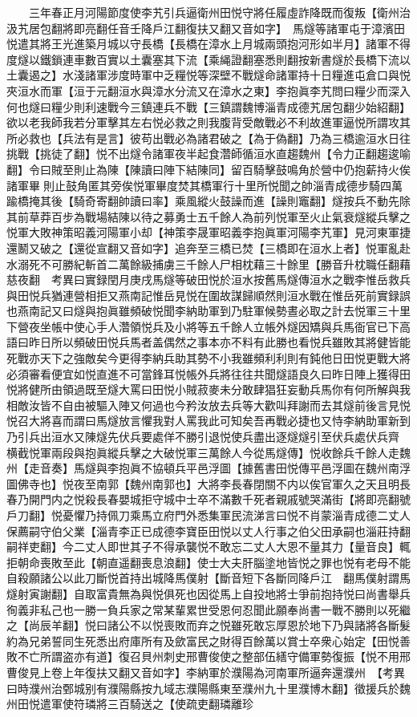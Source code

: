 　　三年春正月河陽節度使李艽引兵逼衛州田悦守將任履虛詐降既而復叛【衛州治汲艽居包翻將即亮翻任音壬降戶江翻復扶又翻又音如字】　馬燧等諸軍屯于漳濱田悦遣其將王光進築月城以守長橋【長橋在漳水上月城兩頭抱河形如半月】諸軍不得度燧以鐵鎖連車數百實以土囊塞其下流【乘䋲證翻塞悉則翻按新書燧於長橋下流以土囊遏之】水淺諸軍涉度時軍中乏糧悦等深壁不戰燧命諸軍持十日糧進屯倉口與悦夾洹水而軍【洹于元翻洹水與漳水分流又在漳水之東】李抱眞李艽問曰糧少而深入何也燧曰糧少則利速戰今三鎮連兵不戰【三鎮謂魏博淄青成德艽居包翻少始紹翻】欲以老我師我若分軍擊其左右悦必救之則我腹背受敵戰必不利故進軍逼悦所謂攻其所必救也【兵法有是言】彼苟出戰必為諸君破之【為于偽翻】乃為三橋逾洹水日往挑戰【挑徒了翻】悦不出燧令諸軍夜半起食濳師循洹水直趨魏州【令力正翻趨逡喻翻】令曰賊至則止為陳【陳讀曰陣下結陳同】留百騎擊鼓鳴角於營中仍抱薪持火俟諸軍畢則止鼓角匿其旁俟悦軍畢度焚其橋軍行十里所悦聞之帥淄青成德步騎四萬踰橋掩其後【騎奇寄翻帥讀曰率】乘風縱火鼓譟而進【譟則竈翻】燧按兵不動先除其前草莽百步為戰場結陳以待之募勇士五千餘人為前列悦軍至火止氣衰燧縱兵擊之悦軍大敗神策昭義河陽軍小却【神策李晟軍昭義李抱眞軍河陽李艽軍】見河東軍捷還鬭又破之【還從宣翻又音如字】追奔至三橋已焚【三橋即在洹水上者】悦軍亂赴水溺死不可勝紀斬首二萬餘級捕虜三千餘人尸相枕藉三十餘里【勝音升枕職任翻藉慈夜翻　考異曰實録閏月庚戌馬燧等破田悦於洹水按舊馬燧傳洹水之戰李惟岳救兵與田悦兵猶連營相拒又燕南記惟岳見悦在圍故謀歸順然則洹水戰在惟岳死前實録誤也燕南記又曰燧與抱眞雖頻破悦聞李納助軍到乃駐軍候勢晝必取之計去悦軍三十里下營夜坐帳中使心手人濳領悦兵及小將等五千餘人立帳外燧因矯與兵馬衙官已下高語曰昨日所以頻破田悦兵馬者盖偶然之事本亦不料有此勝也看悦兵雖敗其將健皆能死戰亦天下之強敵矣今更得李納兵助其勢不小我雖頻利利則有鈍他日田悦更戰大將必須審看便宜如悦直進不可當鋒耳悦帳外兵將往往共聞燧語良久曰昨日陣上獲得田悦將健所由領過既至燧大罵曰田悦小賊菽麥未分敢肆猖狂妄動兵馬你有何所解與我相敵汝皆不自由被驅入陣又何過也今矜汝放去兵等大歡叫拜謝而去其燧前後言見悦悦召大將喜而謂曰馬燧放言懼我對人罵我此可知矣吾再戰必捷也又恃李納助軍新到乃引兵出洹水又陳燧先伏兵要處佯不勝引退悦使兵盡出逐燧燧引至伏兵處伏兵齊横截悦軍兩段與抱眞縱兵擊之大破悦軍三萬餘人今從馬燧傳】悦收餘兵千餘人走魏州【走音奏】馬燧與李抱眞不協頓兵平邑浮圖【據舊書田悦傳平邑浮圖在魏州南浮圖佛寺也】悦夜至南郭【魏州南郭也】大將李長春閉關不内以俟官軍久之天且明長春乃開門内之悦殺長春嬰城拒守城中士卒不滿數千死者親戚號哭滿街【將即亮翻號戶刀翻】悦憂懼乃持佩刀乘馬立府門外悉集軍民流涕言曰悦不肖蒙淄青成德二丈人保薦嗣守伯父業【淄青李正已成德李寶臣田悦以丈人行事之伯父田承嗣也淄莊持翻嗣祥吏翻】今二丈人即世其子不得承襲悦不敢忘二丈人大恩不量其力【量音良】輒拒朝命喪敗至此【朝直遥翻喪息浪翻】使士大夫肝腦塗地皆悦之罪也悦有老母不能自殺願諸公以此刀斷悦首持出城降馬僕射【斷音短下各斷同降戶江　翻馬僕射謂馬燧射寅謝翻】自取富貴無為與悦俱死也因從馬上自投地將士爭前抱持悦曰尚書舉兵徇義非私己也一勝一負兵家之常某輩累世受恩何忍聞此願奉尚書一戰不勝則以死繼之【尚辰羊翻】悦曰諸公不以悦喪敗而弃之悦雖死敢忘厚恩於地下乃與諸將各斷髮約為兄弟誓同生死悉出府庫所有及歛富民之財得百餘萬以賞士卒衆心始定【田悦善敗不亡所謂盗亦有道】復召貝州刺史邢曹俊使之整部伍繕守備軍勢復振【悦不用邢曹俊見上卷上年復扶又翻又音如字】李納軍於濮陽為河南軍所逼奔還濮州　【考異曰時濮州治鄄城别有濮陽縣按九域志濮陽縣東至濮州九十里濮博木翻】徵援兵於魏州田悦遣軍使符璘將三百騎送之【使疏吏翻璘離珍
